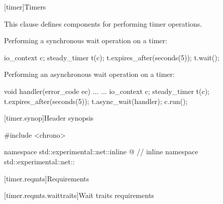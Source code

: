 
[timer]{Timers}

\pnum
This clause defines components for performing timer operations.

\pnum
\begin{example} Performing a synchronous wait operation on a timer:
\begin{codeblock}
io_context c;
steady_timer t(c);
t.expires_after(seconds(5));
t.wait();
\end{codeblock}
 \end{example}

\pnum
\begin{example} Performing an asynchronous wait operation on a timer:
\begin{codeblock}
void handler(error_code ec) { ... }
...
io_context c;
steady_timer t(c);
t.expires_after(seconds(5));
t.async_wait(handler);
c.run();
\end{codeblock}
 \end{example}


%
[timer.synop]{Header  synopsis}

\begin{codeblock}
#include <chrono>

namespace std::experimental::net::inline @ // inline namespace std::experimental::net::\namespacever
\end{codeblock}



[timer.reqmts]{Requirements}


[timer.reqmts.waittraits]{Wait traits requirements}


